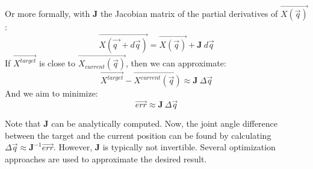 Or more formally, with \textbf{J} the Jacobian matrix of the partial derivatives of $\overrightarrow{X(\overrightarrow{q})}$ :
\begin{equation}
      \overrightarrow{X(\overrightarrow{q^{\ ^{\ }}}+d\overrightarrow{q})}= \overrightarrow{X(\overrightarrow{q})} + \textbf{J} \ d\overrightarrow{q}
\end{equation} 
If $\overrightarrow{X^{target}}$ is close to $\overrightarrow{X_{current}(\overrightarrow{q})}$, then we can approximate:
\begin{equation}\label{eq:jac}
      \overrightarrow{X^{target}} - \overrightarrow{X^{current}(\overrightarrow{q})} \approx \textbf{J} \ \Delta \overrightarrow{q}
\end{equation} 
And we aim to minimize:
\begin{equation}\label{eq:jac}
    \boxed{
      \overrightarrow{err} \approx \textbf{J} \ \Delta \overrightarrow{q} }
\end{equation} 

Note that \textbf{J} can be analytically computed. Now, the joint angle difference between the target and the current position can be found by calculating $\Delta \overrightarrow{q} \approx \textbf{J}^{-1} \overrightarrow{err}$. However, \textbf{J} is typically not invertible. Several optimization approaches are used to approximate the desired result.


